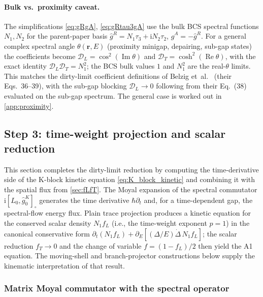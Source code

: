\documentclass[
  aps,
  prb,
  preprint,
  superscriptaddress,
  longbibliography,
  nofootinbib
]{revtex4-2}
\newcommand{\ii}{\mathrm{i}}
\newcommand{\br}{\mathbf{r}}
\newcommand{\DOS}{N_1}
\newcommand{\fL}{f_L}
\newcommand{\fT}{f_T}
\newcommand{\hatg}{\hat{g}}
\newcommand{\Real}{\operatorname{Re}}
\newcommand{\Imag}{\operatorname{Im}}
\begin{document}
\paragraph{Bulk vs.\ proximity caveat.} The simplifications
\cref{eq:gRgA}, \cref{eq:gRtau3gA} use the bulk BCS spectral functions
\(\DOS,N_2\) for the parent-paper basis
\(\hatg^{R}=\DOS\tau_3+\ii N_2\tau_2\), \(\hatg^A=-\hatg^R\). For a
general complex spectral angle \(\theta(\br,E)\) (proximity minigap,
depairing, sub-gap states) the coefficients become
\(\mathcal D_L=\cos^2(\Imag\theta)\) and
\(\mathcal D_T=\cosh^2(\Real\theta)\), with the exact identity
\(\mathcal D_L\mathcal D_T=\DOS^2\); the BCS bulk values \(1\) and
\(\DOS^2\) are the real-\(\theta\) limits. This matches the dirty-limit
coefficient definitions of Belzig et~al.~\cite{belzig1999} (their
Eqs.~36--39), with the sub-gap blocking \(\mathcal D_L\to0\) following
from their Eq.~(38) evaluated on the sub-gap spectrum. The general case
is worked out in \cref{app:proximity}.

\subsection{Step 3: time-weight projection and scalar reduction}
\label{sec:scalar_reduction}

This section completes the dirty-limit reduction by computing the
time-derivative side of the K-block kinetic equation
\cref{eq:K_block_kinetic} and combining it with the spatial flux from
\cref{sec:fLfT}. The Moyal expansion of the spectral commutator
\(\ii[\hat L_0,\hat g_0^{K}]_{\circ}\) generates the time derivative
\(\hbar\partial_t\) and, for a time-dependent gap, the spectral-flow
energy flux. Plain trace projection produces a kinetic equation
for the conserved scalar density \(\DOS\fL\) (i.e., the time-weight
exponent \(p=1\)) in the canonical conservative form
\(\partial_t(\DOS\fL)+\partial_E[(\Delta/E)\dot\Delta\,\DOS\fL]\); the
scalar reduction \(\fT\to 0\) and the change of
variable \(f=(1-\fL)/2\) then yield the A1 equation. The moving-shell and
branch-projector constructions below supply the kinematic
interpretation of that result.

\subsubsection{Matrix Moyal commutator with the spectral operator}
\label{sec:moyal_spectral}
\end{document}
